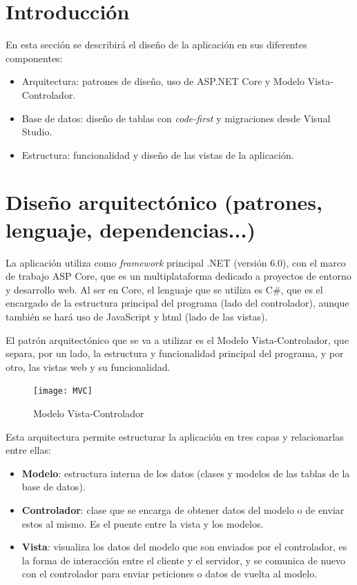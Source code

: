 
\section{Introducción}

En esta sección se describirá el diseño de la aplicación en sus diferentes componentes:
\begin{itemize}
    \item Arquitectura: patrones de diseño, uso de ASP.NET Core y Modelo Vista-Controlador.
    \item Base de datos: diseño de tablas con \emph{code-first} y migraciones desde Visual Studio.
    \item Estructura: funcionalidad y diseño de las vistas de la aplicación.
\end{itemize}

\section{Diseño arquitectónico (patrones, lenguaje, dependencias...)}

La aplicación utiliza como \emph{framework} principal .NET (versión 6.0), con el marco de trabajo ASP Core, que es un multiplataforma dedicado a proyectos de entorno y desarrollo web. Al ser en Core, el lenguaje que se utiliza es C\#, que es el encargado de la estructura principal del programa (lado del controlador), aunque también se hará uso de JavaScript y html (lado de las vistas).

El patrón arquitectónico que se va a utilizar es el Modelo Vista-Controlador, que separa, por un lado, la estructura y funcionalidad principal del programa, y por otro, las vistas web y su funcionalidad. 

\begin{figure}
    \centering
    \texttt{[image: MVC]}
    \caption{Modelo Vista-Controlador}
    
\end{figure}

Esta arquitectura permite estructurar la aplicación en tres capas y relacionarlas entre ellas:
\begin{itemize}
 \item \textbf{Modelo}: estructura interna de los datos (clases y modelos de las tablas de la base de datos).
 \item \textbf{Controlador}: clase que se encarga de obtener datos del modelo o de enviar estos al mismo. Es el puente entre la vista y los modelos.
 \item \textbf{Vista}: visualiza los datos del modelo que son enviados por el controlador, es la forma de interacción entre el cliente y el servidor, y se comunica de nuevo con el controlador para enviar peticiones o datos de vuelta al modelo. 
 \end{itemize}
 
